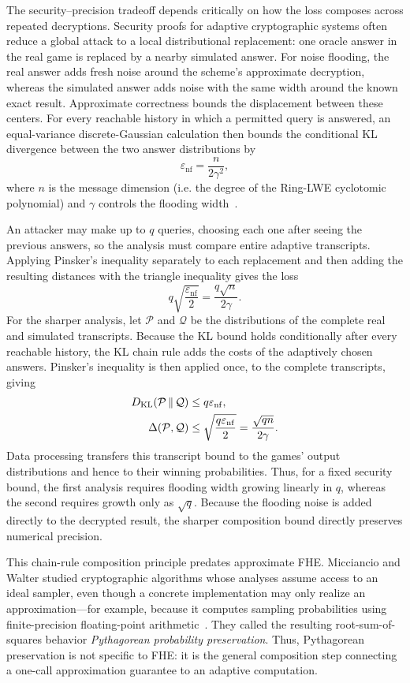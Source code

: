 The security--precision tradeoff depends critically on how the loss composes
across repeated decryptions.  Security proofs for adaptive cryptographic
systems often reduce a global attack to a local distributional replacement:
one oracle answer in the real game is replaced by a nearby simulated answer.
For noise flooding, the real answer adds fresh noise around the scheme's
approximate decryption, whereas the simulated answer adds noise with the same
width around the known exact result.  Approximate correctness bounds the
displacement between these centers.  For every reachable history in which a
permitted query is answered, an equal-variance discrete-Gaussian calculation
then bounds the conditional KL divergence between the two answer distributions
by
\[
  \varepsilon_{\mathrm{nf}} = \frac{n}{2\gamma^2},
\]
where \(n\) is the message dimension (i.e. the degree of the Ring-LWE cyclotomic polynomial)
and \(\gamma\) controls the flooding width~\cite{lmss}.

An attacker may make up to \(q\) queries, choosing each one after seeing the
previous answers, so the analysis must compare entire adaptive transcripts.
Applying Pinsker's inequality separately to each replacement and then adding
the resulting distances with the triangle inequality gives the loss
\[
  q\sqrt{\frac{\varepsilon_{\mathrm{nf}}}{2}}
  = \frac{q\sqrt{n}}{2\gamma}.
\]
For the sharper analysis, let \(\mathcal P\) and \(\mathcal Q\) be the
distributions of the complete real and simulated transcripts.  Because the KL
bound holds conditionally after every reachable history, the KL chain rule
adds the costs of the adaptively chosen answers.  Pinsker's inequality is then
applied once, to the complete transcripts, giving~\cite{lmss,mw17}
\begin{align*}
  D_{\mathrm{KL}}\!\left(\mathcal P\,\|\,\mathcal Q\right)
    &\leq q\varepsilon_{\mathrm{nf}},\\
  \Delta(\mathcal P,\mathcal Q)
    &\leq \sqrt{\frac{q\varepsilon_{\mathrm{nf}}}{2}}
     = \frac{\sqrt{qn}}{2\gamma}.
\end{align*}
Data processing transfers this transcript bound to the games' output
distributions and hence to their winning probabilities.
Thus, for a fixed security bound, the first analysis requires flooding width
growing linearly in \(q\), whereas the second requires growth only as
\(\sqrt q\).  Because the flooding noise is added directly to the decrypted
result, the sharper composition bound directly preserves numerical precision.

This chain-rule composition principle predates approximate FHE.
Micciancio and Walter studied cryptographic algorithms whose analyses assume
access to an ideal sampler, even though a concrete implementation may only
realize an approximation---for example, because it computes sampling
probabilities using finite-precision floating-point arithmetic~\cite{mw17}.
They called the resulting root-sum-of-squares behavior \emph{Pythagorean
probability preservation}.
Thus, Pythagorean preservation is not specific to FHE: it is the general
composition step connecting a one-call approximation guarantee to an adaptive
computation.


